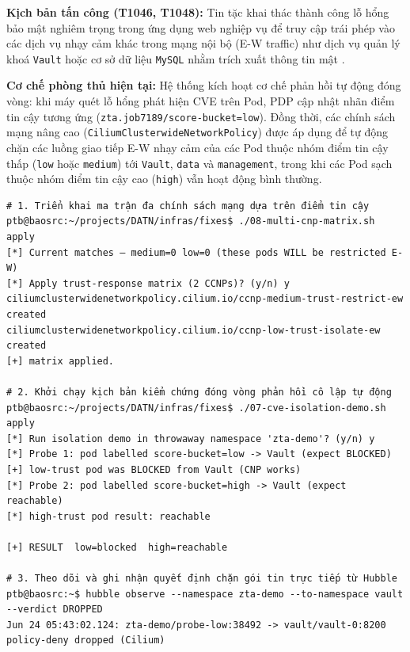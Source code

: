 \textbf{Kịch bản tấn công (T1046, T1048):} Tin tặc khai thác thành công lỗ hổng bảo mật nghiêm trọng trong ứng dụng web nghiệp vụ để truy cập trái phép vào các dịch vụ nhạy cảm khác trong mạng nội bộ (E-W traffic) như dịch vụ quản lý khoá \texttt{Vault} hoặc cơ sở dữ liệu \texttt{MySQL} nhằm trích xuất thông tin mật \parencite{mitre_t1046,mitre_t1048}.

\textbf{Cơ chế phòng thủ hiện tại:} Hệ thống kích hoạt cơ chế phản hồi tự động đóng vòng: khi máy quét lỗ hổng phát hiện CVE trên Pod, PDP cập nhật nhãn điểm tin cậy tương ứng (\texttt{zta.job7189/score-bucket=low}). Đồng thời, các chính sách mạng nâng cao (\texttt{CiliumClusterwideNetworkPolicy}) được áp dụng để tự động chặn các luồng giao tiếp E-W nhạy cảm của các Pod thuộc nhóm điểm tin cậy thấp (\texttt{low} hoặc \texttt{medium}) tới \texttt{Vault}, \texttt{data} và \texttt{management}, trong khi các Pod sạch thuộc nhóm điểm tin cậy cao (\texttt{high}) vẫn hoạt động bình thường. 

\begin{listing}[H]
\begin{verbatim}
# 1. Triển khai ma trận đa chính sách mạng dựa trên điểm tin cậy
ptb@baosrc:~/projects/DATN/infras/fixes$ ./08-multi-cnp-matrix.sh apply
[*] Current matches — medium=0 low=0 (these pods WILL be restricted E-W)
[*] Apply trust-response matrix (2 CCNPs)? (y/n) y
ciliumclusterwidenetworkpolicy.cilium.io/ccnp-medium-trust-restrict-ew created
ciliumclusterwidenetworkpolicy.cilium.io/ccnp-low-trust-isolate-ew created
[+] matrix applied.

# 2. Khởi chạy kịch bản kiểm chứng đóng vòng phản hồi cô lập tự động
ptb@baosrc:~/projects/DATN/infras/fixes$ ./07-cve-isolation-demo.sh apply
[*] Run isolation demo in throwaway namespace 'zta-demo'? (y/n) y
[*] Probe 1: pod labelled score-bucket=low -> Vault (expect BLOCKED)
[+] low-trust pod was BLOCKED from Vault (CNP works)
[*] Probe 2: pod labelled score-bucket=high -> Vault (expect reachable)
[*] high-trust pod result: reachable

[+] RESULT  low=blocked  high=reachable

# 3. Theo dõi và ghi nhận quyết định chặn gói tin trực tiếp từ Hubble
ptb@baosrc:~$ hubble observe --namespace zta-demo --to-namespace vault --verdict DROPPED
Jun 24 05:43:02.124: zta-demo/probe-low:38492 -> vault/vault-0:8200 policy-deny dropped (Cilium)
\end{verbatim}
\caption{Triển khai đa chính sách mạng và kết quả thực chứng cô lập tự động}
\label{lst:c3_kb14}
\end{listing}

